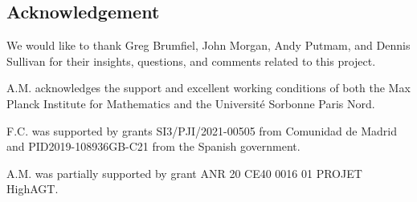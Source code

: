 
\subsection*{Acknowledgement}

We would like to thank Greg Brumfiel, John Morgan, Andy Putmam, and Dennis Sullivan for their insights, questions, and comments related to this project.

A.M. acknowledges the support and excellent working conditions of both the Max Planck Institute for Mathematics and the Universit\'e Sorbonne Paris Nord.

F.C. was supported by grants SI3/PJI/2021-00505 from Comunidad de Madrid and PID2019-108936GB-C21 from the Spanish government.

A.M. was partially supported by grant ANR 20 CE40 0016 01 PROJET HighAGT.